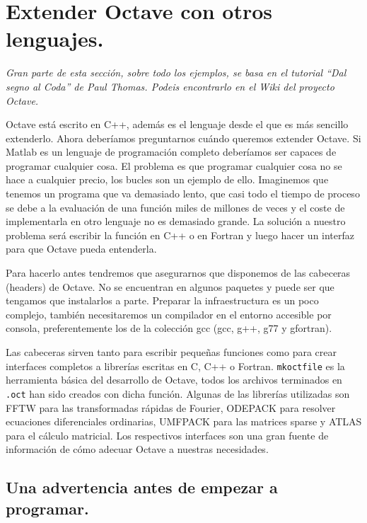 \chapter{Extender Octave con otros
  lenguajes.\label{sec:Extender-Octave-con}}

\emph{Gran parte de esta sección, sobre todo los ejemplos, se basa en
  el tutorial {}``Dal segno al Coda'' de Paul Thomas. Podeis
  encontrarlo en el Wiki del proyecto Octave.}

Octave está escrito en C++, además es el lenguaje desde el que es más
sencillo extenderlo. Ahora deberíamos preguntarnos cuándo queremos
extender Octave. Si Matlab es un lenguaje de programación completo
deberíamos ser capaces de programar cualquier cosa. El problema es que
programar cualquier cosa no se hace a cualquier precio, los bucles son
un ejemplo de ello. Imaginemos que tenemos un programa que va
demasiado lento, que casi todo el tiempo de proceso se debe a la
evaluación de una función miles de millones de veces y el coste de
implementarla en otro lenguaje no es demasiado grande. La solución a
nuestro problema será escribir la función en C++ o en Fortran y luego
hacer un interfaz para que Octave pueda entenderla.

Para hacerlo antes tendremos que asegurarnos que disponemos de las
cabeceras (headers) de Octave. No se encuentran en algunos paquetes y
puede ser que tengamos que instalarlos a parte. Preparar la
infraestructura es un poco complejo, también necesitaremos un
compilador en el entorno accesible por consola, preferentemente los de
la colección gcc (gcc, g++, g77 y gfortran).

Las cabeceras sirven tanto para escribir pequeñas funciones como para
crear interfaces completos a librerías escritas en C, C++ o Fortran.
\texttt{mkoctfile} es la herramienta básica del desarrollo de Octave,
todos los archivos terminados en \texttt{.oct} han sido creados con
dicha función. Algunas de las librerías utilizadas son FFTW para las
transformadas rápidas de Fourier, ODEPACK para resolver ecuaciones
diferenciales ordinarias, UMFPACK para las matrices sparse y ATLAS
para el cálculo matricial. Los respectivos interfaces son una gran
fuente de información de cómo adecuar Octave a nuestras necesidades.


\section{Una advertencia antes de empezar a programar.}

